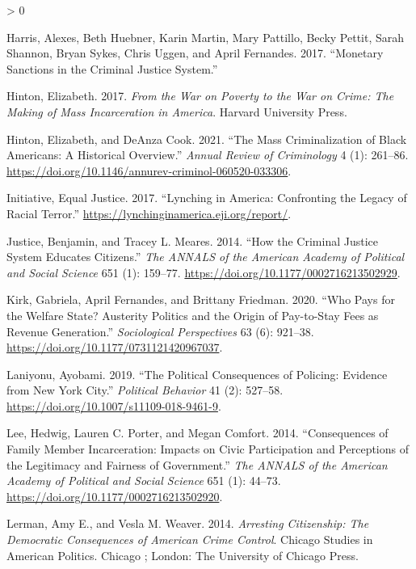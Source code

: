 \documentclass[
  12pt,
]{article}
\newlength{\cslhangindent}
\newenvironment{CSLReferences}[2] %
 {%
  \setlength{\parindent}{0pt}
  \ifodd #1 \everypar{\setlength{\hangindent}{\cslhangindent}}\ignorespaces\fi
  \ifnum #2 > 0
  \setlength{\parskip}{#2\baselineskip}
  \fi
 }%
 {}
\begin{document}
\begin{CSLReferences}{1}{0}
\leavevmode\hypertarget{ref-Harris2017}{}%
Harris, Alexes, Beth Huebner, Karin Martin, Mary Pattillo, Becky Pettit, Sarah Shannon, Bryan Sykes, Chris Uggen, and April Fernandes. 2017. {``Monetary {Sanctions} in the {Criminal Justice System}.''}

\leavevmode\hypertarget{ref-Hinton2017}{}%
Hinton, Elizabeth. 2017. \emph{From the {War} on {Poverty} to the {War} on {Crime}: {The Making} of {Mass Incarceration} in {America}}. {Harvard University Press}.

\leavevmode\hypertarget{ref-Hinton2021}{}%
Hinton, Elizabeth, and DeAnza Cook. 2021. {``The {Mass Criminalization} of {Black Americans}: {A Historical Overview}.''} \emph{Annual Review of Criminology} 4 (1): 261--86. \url{https://doi.org/10.1146/annurev-criminol-060520-033306}.

\leavevmode\hypertarget{ref-EqualJusticeInitiative2017}{}%
Initiative, Equal Justice. 2017. {``Lynching in {America}: {Confronting} the {Legacy} of {Racial Terror}.''} \url{https://lynchinginamerica.eji.org/report/}.

\leavevmode\hypertarget{ref-Justice2014}{}%
Justice, Benjamin, and Tracey L. Meares. 2014. {``How the {Criminal Justice System Educates Citizens}.''} \emph{The ANNALS of the American Academy of Political and Social Science} 651 (1): 159--77. \url{https://doi.org/10.1177/0002716213502929}.

\leavevmode\hypertarget{ref-Kirk2020}{}%
Kirk, Gabriela, April Fernandes, and Brittany Friedman. 2020. {``Who {Pays} for the {Welfare State}? {Austerity Politics} and the {Origin} of {Pay}-to-{Stay Fees} as {Revenue Generation}.''} \emph{Sociological Perspectives} 63 (6): 921--38. \url{https://doi.org/10.1177/0731121420967037}.

\leavevmode\hypertarget{ref-Laniyonu2019}{}%
Laniyonu, Ayobami. 2019. {``The {Political Consequences} of {Policing}: {Evidence} from {New York City}.''} \emph{Political Behavior} 41 (2): 527--58. \url{https://doi.org/10.1007/s11109-018-9461-9}.

\leavevmode\hypertarget{ref-Lee2014}{}%
Lee, Hedwig, Lauren C. Porter, and Megan Comfort. 2014. {``Consequences of {Family Member Incarceration}: {Impacts} on {Civic Participation} and {Perceptions} of the {Legitimacy} and {Fairness} of {Government}.''} \emph{The ANNALS of the American Academy of Political and Social Science} 651 (1): 44--73. \url{https://doi.org/10.1177/0002716213502920}.

\leavevmode\hypertarget{ref-Lerman2014}{}%
Lerman, Amy E., and Vesla M. Weaver. 2014. \emph{Arresting Citizenship: The Democratic Consequences of {American} Crime Control}. Chicago Studies in {American} Politics. {Chicago ; London}: {The University of Chicago Press}.


\end{CSLReferences}
\end{document}
